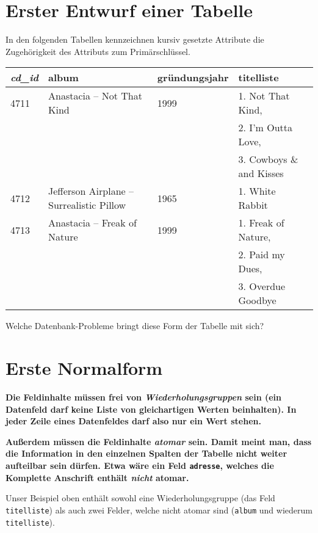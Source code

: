 \section{Erster Entwurf einer Tabelle}

In den folgenden Tabellen kennzeichnen kursiv gesetzte Attribute die
Zugehörigkeit des Attributs zum Primärschlüssel.

\begin{center}
\begin{tabular}{|l|l|l|l|}
\hline
\textbf{\em cd\_id} & \textbf{album} & \textbf{gründungsjahr} &
\textbf{titelliste} \\ \hline
4711 & Anastacia -- Not That Kind & 1999 & 1. Not That Kind, 
\\
& & & 2. I'm Outta Love, \\
& & & 3. Cowboys \& and Kisses \\ \hline 
4712 & Jefferson Airplane -- Surrealistic Pillow & 1965 & 1. White Rabbit \\
\hline
4713 & Anastacia -- Freak of Nature & 1999 & 1. Freak of Nature, \\
& & &  2. Paid my Dues, \\
& & & 3. Overdue Goodbye \\ \hline
\end{tabular}
\end{center}

Welche Datenbank-Probleme bringt diese Form der Tabelle mit sich?


\section{Erste Normalform}

\textbf{Die Feldinhalte müssen frei von \emph{Wiederholungsgruppen} sein (ein
Datenfeld darf keine Liste von gleichartigen Werten beinhalten).
In jeder Zeile eines Datenfeldes darf also nur ein Wert stehen.}

\textbf{Außerdem müssen die Feldinhalte \emph{atomar} sein. Damit meint man,
dass die Information in den einzelnen Spalten der Tabelle nicht weiter
aufteilbar sein dürfen. Etwa wäre ein Feld \lstinline|adresse|, welches die
Komplette Anschrift enthält \emph{nicht} atomar.}

Unser Beispiel oben enthält sowohl eine Wiederholungsgruppe (das Feld
\lstinline|titelliste|) als auch zwei Felder, welche nicht atomar sind
(\lstinline|album| und wiederum \lstinline|titelliste|).

